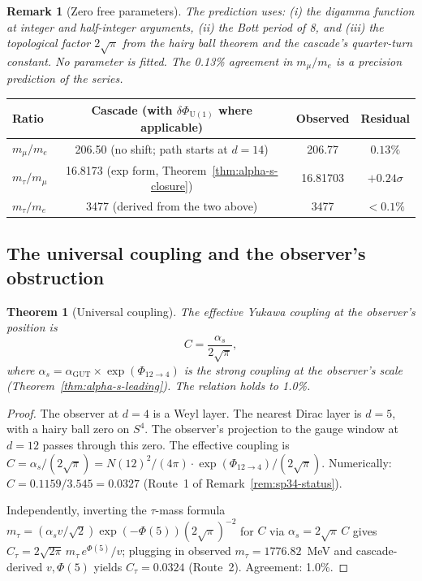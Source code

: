 \documentclass[12pt,a4paper]{article}
\newtheorem{theorem}{Theorem}[section]
\newtheorem*{remark}{Remark}
\begin{document}
\begin{remark}[Zero free parameters]
The prediction uses: (i) the digamma function at integer and half-integer arguments, (ii) the Bott period of 8, and (iii) the topological factor $2\sqrt{\pi}$ from the hairy ball theorem and the cascade's quarter-turn constant. No parameter is fitted. The 0.13\% agreement in $m_\mu/m_e$ is a precision prediction of the series.
\end{remark}

\begin{center}
\begin{tabular}{lccc}
\hline
Ratio & Cascade (with $\delta\Phi_{\mathrm{U}(1)}$ where applicable) & Observed & Residual \\
\hline
$m_\mu/m_e$ & 206.50 (no shift; path starts at $d=14$) & 206.77 & $0.13\%$ \\
$m_\tau/m_\mu$ & 16.8173 (exp form, Theorem~\ref{thm:alpha-s-closure}) & 16.81703 & $+0.24\sigma$ \\
$m_\tau/m_e$ & 3477 (derived from the two above) & 3477 & $<0.1\%$ \\
\hline
\end{tabular}
\end{center}

\subsection{The universal coupling and the observer's obstruction}

\begin{theorem}[Universal coupling]\label{thm:universal-coupling}
The effective Yukawa coupling at the observer's position is
\[
C = \frac{\alpha_s}{2\sqrt{\pi}},
\]
where $\alpha_s = \alpha_{\text{GUT}} \times \exp(\Phi_{12 \to 4})$ is the strong coupling at the observer's scale (Theorem~\ref{thm:alpha-s-leading}). The relation holds to 1.0\%.
\end{theorem}

\begin{proof}
The observer at $d = 4$ is a Weyl layer. The nearest Dirac layer is $d = 5$, with a hairy ball zero on $S^4$. The observer's projection to the gauge window at $d = 12$ passes through this zero. The effective coupling is $C = \alpha_s/(2\sqrt{\pi}) = N(12)^2/(4\pi) \cdot \exp(\Phi_{12 \to 4})/(2\sqrt{\pi})$. Numerically: $C = 0.1159/3.545 = 0.0327$ (Route~1 of Remark~\ref{rem:sp34-status}).

Independently, inverting the $\tau$-mass formula
$m_\tau = (\alpha_s v/\sqrt{2})\exp(-\Phi(5))(2\sqrt{\pi})^{-2}$
for $C$ via $\alpha_s = 2\sqrt{\pi}\,C$ gives
$C_\tau = 2\sqrt{2\pi}\,m_\tau\,e^{\Phi(5)}/v$; plugging in observed
$m_\tau = 1776.82$~MeV and cascade-derived $v, \Phi(5)$ yields
$C_\tau = 0.0324$ (Route~2). Agreement: 1.0\%.
\end{proof}
\end{document}
